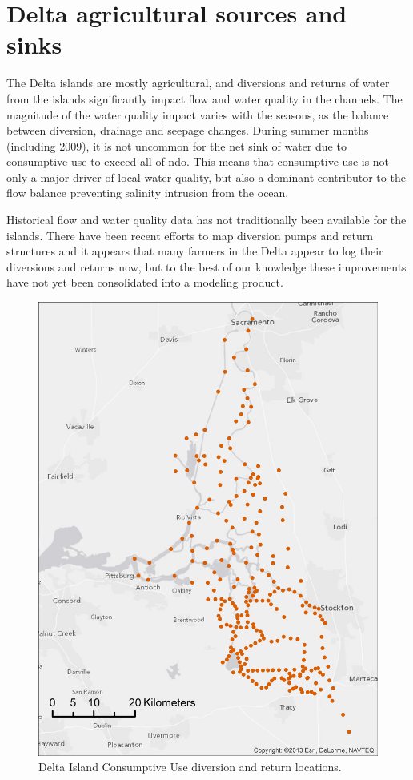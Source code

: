\section{Delta agricultural sources and sinks}
The Delta islands are mostly agricultural, and diversions and returns of water from the islands significantly impact 
flow and water quality in the channels. The magnitude of the water quality impact varies with the seasons, as 
the balance between diversion, drainage and seepage changes. During summer months (including 2009), it is not
uncommon for the net sink of water due to consumptive use to exceed all of \gls{ndo}. This means that consumptive
use is not only a major driver of local water quality, but also a dominant contributor to the flow balance preventing
salinity intrusion from the ocean. 

Historical flow and water quality data has not traditionally been available for the islands. 
There have been recent efforts to map diversion pumps and return structures and it appears that many farmers in the Delta appear to log their diversions and returns now, but to the best of our knowledge these 
improvements have not yet been consolidated into a modeling product.  

\begin{figure}
	\centering
		\includegraphics[scale=0.75]{image/dicu}
	\caption{Delta Island Consumptive Use diversion and return locations.}
	\label{fig:dicu}
\end{figure}

